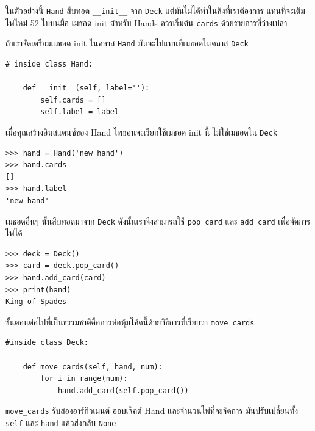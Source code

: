 ในตัวอย่างนี้ {\tt Hand} สืบทอด \verb"__init__" จาก {\tt Deck} แต่มันไม่ได้ทำในสิ่งที่เราต้องการ 
แทนที่จะเติมไพ่ใหม่ 52 ใบบนมือ เมธอด init สำหรับ Hands ควรเริ่มต้น {\tt cards} ด้วยรายการที่ว่างเปล่า

ถ้าเราจัดเตรียมเมธอด init ในคลาส {\tt Hand} มันจะไปแทนที่เมธอดในคลาส {\tt Deck}

\begin{verbatim}
# inside class Hand:

    def __init__(self, label=''):
        self.cards = []
        self.label = label
\end{verbatim}
%
เมื่อคุณสร้างอินสแตนซ์ของ Hand ไพธอนจะเรียกใช้เมธอด init นี้ ไม่ใช่เมธอดใน {\tt Deck}

\begin{verbatim}
>>> hand = Hand('new hand')
>>> hand.cards
[]
>>> hand.label
'new hand'
\end{verbatim}
%
เมธอดอื่นๆ นั้นสืบทอดมาจาก {\tt Deck} ดังนั้นเราจึงสามารถใช้ \verb"pop_card" และ \verb"add_card" เพื่อจัดการไพ่ได้

\begin{verbatim}
>>> deck = Deck()
>>> card = deck.pop_card()
>>> hand.add_card(card)
>>> print(hand)
King of Spades
\end{verbatim}
%
ขั้นตอนต่อไปที่เป็นธรรมชาติคือการห่อหุ้มโค้ดนี้ด้วยวิธีการที่เรียกว่า \verb"move_cards"

\begin{verbatim}
#inside class Deck:

    def move_cards(self, hand, num):
        for i in range(num):
            hand.add_card(self.pop_card())
\end{verbatim}
%

\verb"move_cards" รับสองอาร์กิวเมนต์ ออบเจ๊คต์ Hand และจำนวนไพ่ที่จะจัดการ มันปรับเปลี่ยนทั้ง {\tt self} และ {\tt hand} แล้วส่งกลับ {\tt None}



